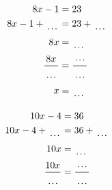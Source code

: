 \documentclass[12pt]{article}
\newcounter{minipagecount}
\begin{document}
\begin{multicols}{2}
\begin{minipage}[t]{0.45\textwidth}
    \raggedright %
    \begin{align*} %
        8x - 1 &= 23\\
        8x - 1 + \dotuline{\hspace{5mm}} &= 23 + \dotuline{\hspace{5mm}}\\
        8x &= \dotuline{\hspace{5mm}}\\
        \frac{8x}{\dotuline{\hspace{5mm}}} &= \frac{\dotuline{\hspace{5mm}}}{\dotuline{\hspace{5mm}}}\\
        x &= \dotuline{\hspace{5mm}}\\
    \end{align*}
\end{minipage} %
\noindent{(\theminipagecount)}\hspace{0.1mm} %
\begin{minipage}[t]{0.45\textwidth} %
    \vspace{-26pt}  %
    \raggedright %
    \begin{align*} %
        10x - 4 &= 36\\
        10x - 4 + \dotuline{\hspace{5mm}} &= 36 + \dotuline{\hspace{5mm}}\\
        10x &= \dotuline{\hspace{5mm}}\\
        \frac{10x}{\dotuline{\hspace{5mm}}} &= \frac{\dotuline{\hspace{5mm}}}{\dotuline{\hspace{5mm}}}\\

\end{align*}
\end{minipage}
\end{multicols}
\end{document}

